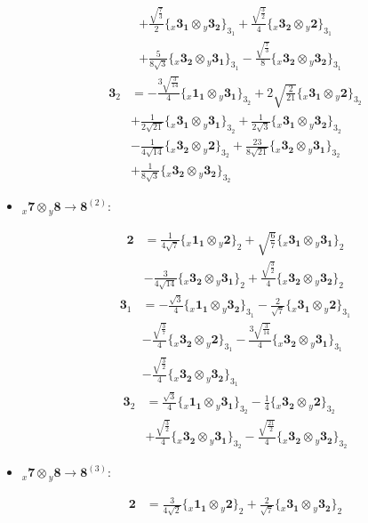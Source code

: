 \documentclass[english]{article}
\newcommand{\rep}[1]{\mathbf{#1}}
\newcommand{\repx}[2]{{}_{#2}\mathbf{#1}}
\newcommand{\tsprodx}[2]{\repx{#1}{x}\otimes\repx{#2}{y}}
\newcommand{\subcgs}[3]{\big\{ \tsprodx{#1}{#2}\big\}^{}_{#3}}
\begin{document}
\begin{itemize}
\begin{fleqn}
\begin{align*}
 & +\frac{\sqrt{\frac{7}{3}}}{2}\subcgs{3_{1}}{3_{2}}{3_{1}}+\frac{\sqrt{\frac{3}{2}}}{4}\subcgs{3_{2}}{2}{3_{1}} \\ 
 & +\frac{5}{8 \sqrt{3}}\subcgs{3_{2}}{3_{1}}{3_{1}}-\frac{\sqrt{\frac{7}{3}}}{8}\subcgs{3_{2}}{3_{2}}{3_{1}}
\end{align*}
\begin{align*}
\rep{3}_{2} & = -\frac{3 \sqrt{\frac{3}{14}}}{4}\subcgs{1_{1}}{3_{1}}{3_{2}}+2 \sqrt{\frac{2}{21}}\subcgs{3_{1}}{2}{3_{2}} \\ 
 & +\frac{1}{2 \sqrt{21}}\subcgs{3_{1}}{3_{1}}{3_{2}}+\frac{1}{2 \sqrt{3}}\subcgs{3_{1}}{3_{2}}{3_{2}} \\ 
 & -\frac{1}{4 \sqrt{14}}\subcgs{3_{2}}{2}{3_{2}}+\frac{23}{8 \sqrt{21}}\subcgs{3_{2}}{3_{1}}{3_{2}} \\ 
 & +\frac{1}{8 \sqrt{3}}\subcgs{3_{2}}{3_{2}}{3_{2}}
\end{align*}
\end{fleqn}
\item $\tsprodx{7}{8}\to\rep{8}^{(2)}$:
\begin{fleqn}
\begin{align*}
\rep{2} & = \frac{1}{4 \sqrt{7}}\subcgs{1_{1}}{2}{2}+\sqrt{\frac{6}{7}}\subcgs{3_{1}}{3_{1}}{2} \\ 
 & -\frac{3}{4 \sqrt{14}}\subcgs{3_{2}}{3_{1}}{2}+\frac{\sqrt{\frac{3}{2}}}{4}\subcgs{3_{2}}{3_{2}}{2}
\end{align*}
\begin{align*}
\rep{3}_{1} & = -\frac{\sqrt{3}}{4}\subcgs{1_{1}}{3_{2}}{3_{1}}-\frac{2}{\sqrt{7}}\subcgs{3_{1}}{2}{3_{1}} \\ 
 & -\frac{\sqrt{\frac{3}{7}}}{4}\subcgs{3_{2}}{2}{3_{1}}-\frac{3 \sqrt{\frac{3}{14}}}{4}\subcgs{3_{2}}{3_{1}}{3_{1}} \\ 
 & -\frac{\sqrt{\frac{3}{2}}}{4}\subcgs{3_{2}}{3_{2}}{3_{1}}
\end{align*}
\begin{align*}
\rep{3}_{2} & = \frac{\sqrt{3}}{4}\subcgs{1_{1}}{3_{1}}{3_{2}}-\frac{1}{4}\subcgs{3_{2}}{2}{3_{2}} \\ 
 & +\frac{\sqrt{\frac{3}{2}}}{4}\subcgs{3_{2}}{3_{1}}{3_{2}}-\frac{\sqrt{\frac{21}{2}}}{4}\subcgs{3_{2}}{3_{2}}{3_{2}}
\end{align*}
\end{fleqn}
\item $\tsprodx{7}{8}\to\rep{8}^{(3)}$:
\begin{fleqn}
\begin{align*}
\rep{2} & = \frac{3}{4 \sqrt{2}}\subcgs{1_{1}}{2}{2}+\frac{2}{\sqrt{7}}\subcgs{3_{1}}{3_{2}}{2} \\ 

\end{align*}
\end{fleqn}
\end{itemize}
\end{document}
